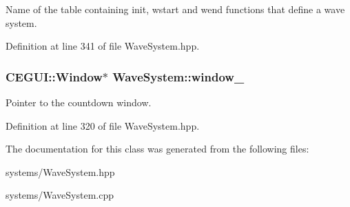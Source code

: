 Name of the table containing init, wstart and wend functions that define a wave system. 



Definition at line 341 of file Wave\+System.\+hpp.

\subsubsection[{\texorpdfstring{window\+\_\+}{window_}}]{\setlength{\rightskip}{0pt plus 5cm}C\+E\+G\+U\+I\+::\+Window$\ast$ Wave\+System\+::window\+\_\+\hspace{0.3cm}{\ttfamily [private]}}\hypertarget{class_wave_system_ab945c8a6f6608420128bc1e0c101cb09}{}\label{class_wave_system_ab945c8a6f6608420128bc1e0c101cb09}


Pointer to the countdown window. 



Definition at line 320 of file Wave\+System.\+hpp.



The documentation for this class was generated from the following files\+:\begin{DoxyCompactItemize}
\item 
systems/Wave\+System.\+hpp\item 
systems/Wave\+System.\+cpp\end{DoxyCompactItemize}
